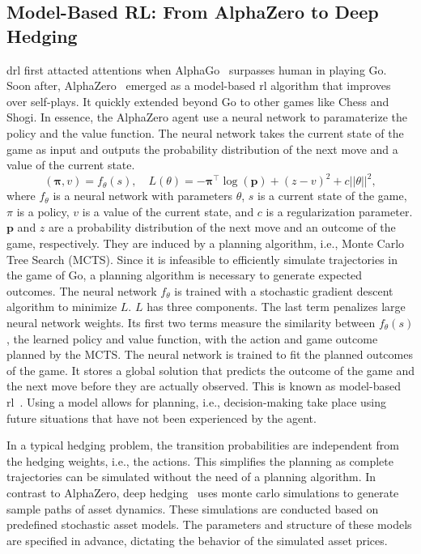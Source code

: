 \subsection{Model-Based RL: From AlphaZero to Deep Hedging}
\gls{drl} first attacted attentions when AlphaGo~\citep{silver2016mastering} surpasses human in playing Go. 
Soon after, AlphaZero~\citep{silver2016mastering} emerged as a model-based \gls{rl} algorithm that improves over self-plays.
It quickly extended beyond Go to other games like Chess and Shogi.
In essence, the AlphaZero agent use a neural network to paramaterize the policy and the value function.
The neural network takes the current state of the game as input and outputs the probability distribution of the next move and a value of the current state.
\begin{equation}
    (\mathbf{\pi}, v) = f_{\theta}(s), \quad L(\theta) = - \mathbf{\pi}^{\intercal} \log(\mathbf{p}) + (z - v)^2  + c||\theta||^2,
\end{equation}
where $f_{\theta}$ is a neural network with parameters $\theta$, $s$ is a current state of the game, $\pi$ is a policy, $v$ is a value of the current state, and $c$ is a regularization parameter.
$\mathbf{p}$ and $z$ are a probability distribution of the next move and an outcome of the game, respectively.
They are induced by a planning algorithm, i.e., Monte Carlo Tree Search (MCTS).
Since it is infeasible to efficiently simulate trajectories in the game of Go, a planning algorithm is necessary to generate expected outcomes.
The neural network $f_{\theta}$ is trained with a stochastic gradient descent algorithm to minimize $L$.
$L$ has three components.
The last term penalizes large neural network weights.
Its first two terms measure the similarity between $f_{\theta}(s)$, the learned policy and value function, with the action and game outcome planned by the MCTS.
The neural network is trained to fit the planned outcomes of the game.
It stores a global solution that predicts the outcome of the game and the next move before they are actually observed.
This is known as model-based \gls{rl}~\citep{sutton2018reinforcement}.
Using a model allows for planning, i.e., decision-making take place using future situations that have not been experienced by the agent.

In a typical hedging problem, the transition probabilities are independent from the hedging weights, i.e., the actions.
This simplifies the planning as complete trajectories can be simulated without the need of a planning algorithm.
In contrast to AlphaZero, deep hedging~\citep{buehler2019deep} uses monte carlo simulations to generate sample paths of asset dynamics.
These simulations are conducted based on predefined stochastic asset models. 
The parameters and structure of these models are specified in advance, dictating the behavior of the simulated asset prices.

